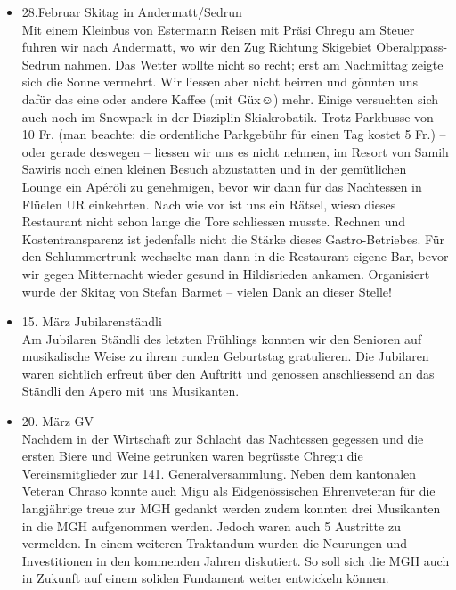\begin{history}
\begin{itemize}
            \item 28.Februar Skitag in Andermatt/Sedrun\\
                  Mit einem Kleinbus von Estermann Reisen mit Präsi Chregu am
                  Steuer fuhren wir nach Andermatt, wo wir den Zug Richtung
                  Skigebiet Oberalppass-Sedrun nahmen. Das Wetter wollte nicht
                  so recht; erst am Nachmittag zeigte sich die Sonne vermehrt.
                  Wir liessen aber nicht beirren und gönnten uns dafür das eine
                  oder andere Kaffee (mit Güx☺) mehr. Einige versuchten sich
                  auch noch im Snowpark in der Disziplin Skiakrobatik. Trotz
                  Parkbusse von 10 Fr. (man beachte: die ordentliche Parkgebühr
                  für einen Tag kostet 5 Fr.) – oder gerade deswegen – liessen
                  wir uns es nicht nehmen, im Resort von Samih Sawiris noch
                  einen kleinen Besuch abzustatten und in der gemütlichen Lounge
                  ein Apéröli zu genehmigen, bevor wir dann für das Nachtessen
                  in Flüelen UR einkehrten. Nach wie vor ist uns ein Rätsel,
                  wieso dieses Restaurant nicht schon lange die Tore schliessen
                  musste. Rechnen und Kostentransparenz ist jedenfalls nicht die
                  Stärke dieses Gastro-Betriebes. Für den Schlummertrunk
                  wechselte man dann in die Restaurant-eigene Bar, bevor wir
                  gegen Mitternacht wieder gesund in Hildisrieden ankamen.
                  Organisiert wurde der Skitag von Stefan Barmet – vielen Dank
                  an dieser Stelle!

            \item 15. März Jubilarenständli\\
                  Am Jubilaren Ständli des letzten Frühlings konnten wir den
                  Senioren auf musikalische Weise zu ihrem runden Geburtstag
                  gratulieren. Die Jubilaren waren sichtlich erfreut über den
                  Auftritt und genossen anschliessend an das Ständli den Apero
                  mit uns Musikanten.

            \item 20. März GV\\
                  Nachdem in der Wirtschaft zur Schlacht das Nachtessen gegessen
                  und die ersten Biere und Weine getrunken waren begrüsste
                  Chregu die Vereinsmitglieder zur 141. Generalversammlung.
                  Neben dem kantonalen Veteran Chraso konnte auch Migu als
                  Eidgenössischen Ehrenveteran für die langjährige treue zur MGH
                  gedankt werden zudem konnten drei Musikanten in die MGH
                  aufgenommen werden. Jedoch waren auch 5 Austritte zu
                  vermelden. In einem weiteren Traktandum wurden die Neurungen
                  und Investitionen in den kommenden Jahren diskutiert. So soll
                  sich die MGH auch in Zukunft auf einem soliden Fundament
                  weiter entwickeln können.


\end{itemize}
\end{history}
